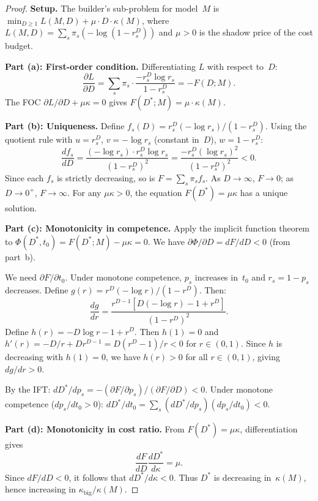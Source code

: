 \documentclass[twoside,11pt]{article}
\newcommand{\Dstar}{D^*}
\newcommand{\kappabig}{\kappa_{\mathrm{big}}}
\begin{document}
\begin{proof}
\noindent\textbf{Setup.}
The builder's sub-problem for model~$M$ is
$\min_{D \ge 1} L(M,D) + \mu \cdot D \cdot \kappa(M)$,
where $L(M,D) = \sum_s \pi_s (-\log(1 - r_s^D))$ and $\mu > 0$ is the shadow price of the cost budget.

\noindent\textbf{Part (a): First-order condition.}
Differentiating $L$ with respect to~$D$:
\[
  \frac{\partial L}{\partial D}
  = \sum_s \pi_s \cdot \frac{-r_s^D \log r_s}{1 - r_s^D}
  = -F(D; M).
\]
The FOC $\partial L/\partial D + \mu \kappa = 0$ gives $F(\Dstar; M) = \mu \cdot \kappa(M)$.

\noindent\textbf{Part (b): Uniqueness.}
Define $f_s(D) = r_s^D (-\log r_s) / (1 - r_s^D)$.
Using the quotient rule with $u = r_s^D$, $v = -\log r_s$ (constant in~$D$), $w = 1 - r_s^D$:
\[
  \frac{df_s}{dD} = \frac{(-\log r_s) \cdot r_s^D \log r_s}{(1-r_s^D)^2}
  = \frac{-r_s^D (\log r_s)^2}{(1-r_s^D)^2} < 0.
\]
Since each $f_s$ is strictly decreasing, so is $F = \sum_s \pi_s f_s$.
As $D \to \infty$, $F \to 0$; as $D \to 0^+$, $F \to \infty$.
For any $\mu \kappa > 0$, the equation $F(\Dstar) = \mu \kappa$ has a unique solution.

\noindent\textbf{Part (c): Monotonicity in competence.}
Apply the implicit function theorem to $\Phi(\Dstar, t_0) = F(\Dstar; M) - \mu\kappa = 0$.
We have $\partial \Phi / \partial D = dF/dD < 0$ (from part~b).

We need $\partial F / \partial t_0$.
Under monotone competence, $p_s$ increases in~$t_0$ and $r_s = 1-p_s$ decreases.
Define $g(r) = r^D(-\log r)/(1-r^D)$.
Then:
\[
  \frac{dg}{dr} = \frac{r^{D-1}[D(-\log r) - 1 + r^D]}{(1-r^D)^2}.
\]
Define $h(r) = -D\log r - 1 + r^D$.
Then $h(1) = 0$ and $h'(r) = -D/r + Dr^{D-1} = D(r^D - 1)/r < 0$ for $r \in (0,1)$.
Since $h$ is decreasing with $h(1) = 0$, we have $h(r) > 0$ for all $r \in (0,1)$, giving $dg/dr > 0$.

By the IFT:
$d\Dstar/dp_s = -(\partial F/\partial p_s) / (\partial F/\partial D) < 0$.
Under monotone competence ($dp_s/dt_0 > 0$):
$d\Dstar/dt_0 = \sum_s (d\Dstar/dp_s)(dp_s/dt_0) < 0$.

\noindent\textbf{Part (d): Monotonicity in cost ratio.}
From $F(\Dstar) = \mu\kappa$, differentiation gives
\[
  \frac{dF}{dD}\frac{d\Dstar}{d\kappa}=\mu.
\]
Since $dF/dD < 0$, it follows that $d\Dstar/d\kappa < 0$.
Thus $\Dstar$ is decreasing in~$\kappa(M)$, hence increasing in $\kappabig/\kappa(M)$.
\end{proof}
\end{document}
